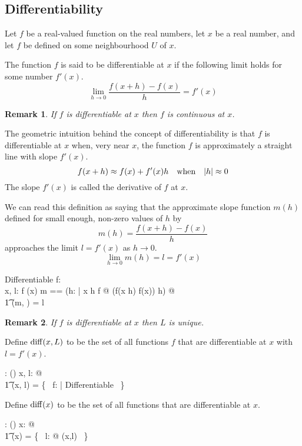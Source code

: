 \documentclass[11pt, oneside]{article}
\newtheorem*{remark}{Remark}
\begin{document}
\subsection{Differentiability}

Let $f$ be a real-valued function on the real numbers, let $x$ be a real number,
and let $f$ be defined on some neighbourhood $U$ of $x$.

The function $f$ is said to be differentiable at $x$ if the following limit holds for some number $f'(x)$.
$$
\lim_{h \to 0} \frac{f(x+h) - f(x)}{h} = f'(x)
$$

\begin{remark}
If $f$ is differentiable at $x$ then $f$ is continuous at $x$.
\end{remark}

The geometric intuition behind the concept of differentiability is that $f$ is differentiable at $x$
when, very near $x$, the function $f$ is approximately a straight line with slope $f'(x)$.
$$
f(x + h) \approx f(x) + f'(x) h \quad \text{when} \quad \abs{h} \approx 0
$$
The slope $f'(x)$ is called the derivative of $f$ at $x$.

We can read this definition as saying that the approximate slope function $m(h)$ defined for 
small enough, non-zero values of $h$ by
$$
	m(h) = \frac{f(x + h) - f(x)}{h}
$$
approaches the limit $l = f'(x)$ as $h \to 0$.
$$
	\lim_{h\to 0}{m(h)} = l = f'(x)
$$

\begin{schema}{Differentiable}
	f: \R \pfun \R \\
	x, l: \R
\where
	f \in \CzeroR(x)
\also
	\LET m == (\lambda h: \Rnz | x \addR h \in \dom f @ (f(x \addR h) \subR f(x)) \divR h) @ \\
	\t1	\limFR(m, \zeroR) = l
\end{schema}
\begin{remark}
If $f$ is differentiable at $x$ then $L$ is unique.
\end{remark}

Define $\operatorname{diff}(x,L)$ to be the set of all functions $f$ that are differentiable at $x$ with $l = f'(x)$.
\begin{axdef}
	\diffRR: \R \cross \R \fun \power(\R \pfun \R)
\where
	\forall x, l: \R @ \\
	\t1	\diffRR(x, l) = \{~ f: \R \pfun \R | Differentiable ~\}
\end{axdef}

Define $\operatorname{diff}(x)$ to be the set of all functions that are differentiable at $x$.
\begin{axdef}
	\diffR: \R \fun \power(\R \pfun \R)
\where
	\forall x: \R @ \\
	\t1	\diffR(x) = \bigcup \{~ l: \R @ \diffRR(x,l) ~\}
\end{axdef}
\end{document}
